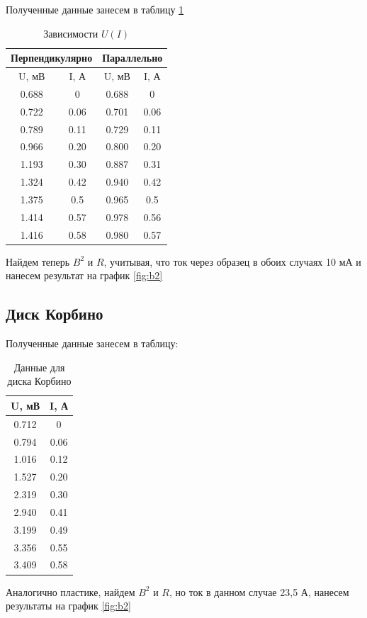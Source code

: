 \documentclass[a4paper, 12pt]{article}
\begin{document}
Полученные данные занесем в таблицу \ref{tab:plate}

\begin{table}[H]
\centering
\begin{tabular}{|cc|cc|}
\hline
\multicolumn{2}{|c|}{\textbf{Перпендикулярно}} & \multicolumn{2}{c|}{\textbf{Параллельно}}  \\ \hline
\multicolumn{1}{|c|}{U, мВ}       & I, А       & \multicolumn{1}{c|}{U, мВ} & I, А \\ \hline
\multicolumn{1}{|c|}{0.688}       & 0          & \multicolumn{1}{c|}{0.688} & 0    \\ \hline
\multicolumn{1}{|c|}{0.722}       & 0.06       & \multicolumn{1}{c|}{0.701} & 0.06 \\ \hline
\multicolumn{1}{|c|}{0.789}       & 0.11       & \multicolumn{1}{c|}{0.729} & 0.11 \\ \hline
\multicolumn{1}{|c|}{0.966}       & 0.20       & \multicolumn{1}{c|}{0.800} & 0.20 \\ \hline
\multicolumn{1}{|c|}{1.193}       & 0.30       & \multicolumn{1}{c|}{0.887} & 0.31 \\ \hline
\multicolumn{1}{|c|}{1.324}       & 0.42       & \multicolumn{1}{c|}{0.940} & 0.42 \\ \hline
\multicolumn{1}{|c|}{1.375}       & 0.5        & \multicolumn{1}{c|}{0.965} & 0.5  \\ \hline
\multicolumn{1}{|c|}{1.414}       & 0.57       & \multicolumn{1}{c|}{0.978} & 0.56 \\ \hline
\multicolumn{1}{|c|}{1.416}       & 0.58       & \multicolumn{1}{c|}{0.980} & 0.57 \\ \hline
\end{tabular}
\caption{Зависимости $U(I)$}
\label{tab:plate}
\end{table}
Найдем теперь $B^2$ и $R$, учитывая, что ток через образец в обоих случаях 10 мА и нанесем результат на график \ref{fig:b2}

\subsection*{Диск Корбино}
Полученные данные занесем в таблицу:
\begin{table}[H]
	\centering
	\begin{tabular}{|c|c|}
	\hline
	U, мВ & I, А \\ \hline
	0.712 & 0    \\ \hline
	0.794 & 0.06 \\ \hline
	1.016 & 0.12 \\ \hline
	1.527 & 0.20 \\ \hline
	2.319 & 0.30 \\ \hline
	2.940 & 0.41 \\ \hline
	3.199 & 0.49 \\ \hline
	3.356 & 0.55 \\ \hline
	3.409 & 0.58 \\ \hline
	\end{tabular}
	\caption{Данные для диска Корбино}
	\label{tab:disk}
	\end{table}
Аналогично пластике, найдем $B^2$ и $R$, но ток в данном случае 23,5 А, нанесем результаты на график \ref{fig:b2}
\end{document}
